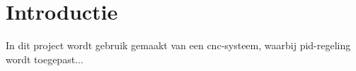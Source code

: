 \section{Introductie}

In dit project wordt gebruik gemaakt van een \gls{cnc}-systeem, waarbij \gls{pid}-regeling wordt toegepast...
